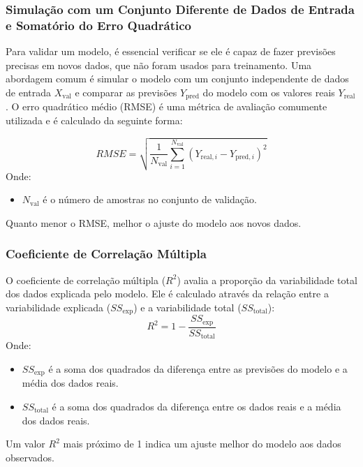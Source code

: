 \documentclass[a4paper,12pt]{article}
\begin{document}
\subsubsection{Simulação com um Conjunto Diferente de Dados de Entrada e Somatório do Erro Quadrático}

Para validar um modelo, é essencial verificar se ele é capaz de fazer previsões precisas em novos dados, que não foram usados para treinamento. Uma abordagem comum é simular o modelo com um conjunto independente de dados de entrada \(X_{\text{val}}\) e comparar as previsões \(Y_{\text{pred}}\) do modelo com os valores reais \(Y_{\text{real}}\). O erro quadrático médio (RMSE) é uma métrica de avaliação comumente utilizada e é calculado da seguinte forma:

\begin{equation}
    RMSE = \sqrt{\frac{1}{N_{\text{val}}} \sum_{i=1}^{N_{\text{val}}} (Y_{\text{real},i} - Y_{\text{pred},i})^2}\tag{2.10.1.1}
\end{equation}
Onde:
\begin{itemize}
    \item \(N_{\text{val}}\) é o número de amostras no conjunto de validação.
\end{itemize}
Quanto menor o RMSE, melhor o ajuste do modelo aos novos dados.

\subsubsection{Coeficiente de Correlação Múltipla}

O coeficiente de correlação múltipla (\(R^2\)) avalia a proporção da variabilidade total dos dados explicada pelo modelo. Ele é calculado através da relação entre a variabilidade explicada (\(SS_{\text{exp}}\)) e a variabilidade total (\(SS_{\text{total}}\)):
\begin{equation}
    R^2 = 1 - \frac{SS_{\text{exp}}}{SS_{\text{total}}}\tag{2.10.2.1}
\end{equation}
Onde:
\begin{itemize}
    \item \(SS_{\text{exp}}\) é a soma dos quadrados da diferença entre as previsões do modelo e a média dos dados reais.
    \item \(SS_{\text{total}}\) é a soma dos quadrados da diferença entre os dados reais e a média dos dados reais.
\end{itemize}
Um valor \(R^2\) mais próximo de 1 indica um ajuste melhor do modelo aos dados observados.
\end{document}
